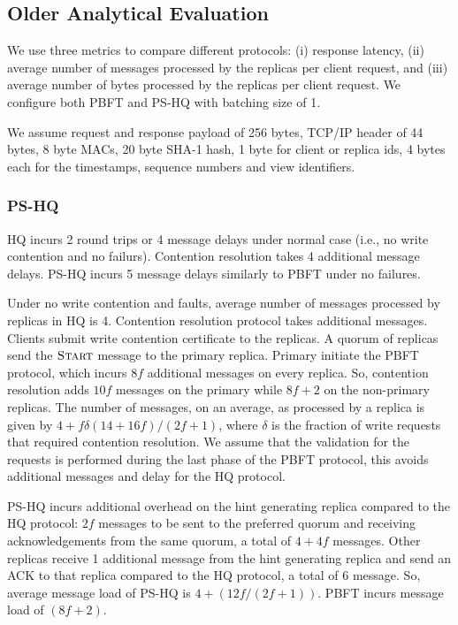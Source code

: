 \documentclass[twocolumn,10pt]{article}
\newcommand{\msg}[1]{\ensuremath{\textsc{#1}}}
\newcommand{\stitle}[1]{\vspace{2pt}{\bf #1:}}
\begin{document}
\subsection{Older Analytical Evaluation}
We use three metrics to compare different protocols: (i) response latency,
(ii) average number of messages processed by the replicas per client request, and (iii) 
average number of bytes processed by the replicas per client request.
We configure both PBFT and PS-HQ with batching size of 1. 


\stitle{Assumptions} We assume request and response payload of 256 bytes, TCP/IP header of 44 bytes,
8 byte MACs, 20 byte SHA-1 hash, 1 byte for client or replica ids, 4 bytes each for
the timestamps, sequence numbers and view identifiers.

\subsubsection{PS-HQ}
\stitle{Response latency}
HQ incurs 2 round trips or 4 message delays under normal case (i.e., no write contention and no
failurs). Contention resolution takes 4 additional message delays. 
PS-HQ incurs 5 message delays similarly to PBFT under no failures.

\stitle{Message load} Under no write contention and faults, average number of messages processed
by replicas in HQ is 4. Contention resolution protocol takes additional messages. Clients submit 
write contention certificate to the replicas. A quorum of replicas send the $\msg{Start}$ message
to the primary replica. Primary initiate the PBFT protocol, which incurs $8f$ additional messages 
on every replica. So, contention resolution adds $10f$ messages on the primary while $8f+2$ on the
non-primary replicas. The number of messages, on an average, as processed by a replica 
is given by $4+f\delta(14+16f)/(2f+1)$, where $\delta$ is the fraction of write requests that
required contention resolution. We assume that the validation for the requests is performed during
the last phase of the PBFT protocol, this avoids additional messages and delay for the HQ protocol.

PS-HQ incurs additional overhead on the hint generating replica compared to the HQ protocol: $2f$ messages
to be sent to the preferred quorum and receiving acknowledgements from the same quorum, a total
of $4+4f$ messages. Other replicas
receive 1 additional message from the hint generating replica and send an ACK to that replica compared 
to the HQ protocol, a total
of 6 message.
So, average message load of PS-HQ is $4+(12f/(2f+1))$. PBFT incurs message
load of $(8f+2)$. 
\end{document}
